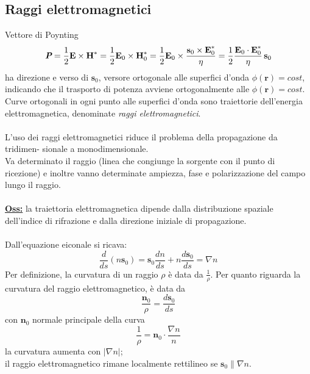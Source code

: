 \documentclass[a4paper]{article}
\begin{document}
\subsection*{Raggi elettromagnetici}
Vettore di Poynting
\begin{equation*}
\emph{\textbf{P}}=\frac{1}{2}\textbf{E}\times\textbf{H}^*=\frac{1}{2}\textbf{E}_0\times\textbf{H}_0^*=\frac{1}{2}\textbf{E}_0\times\frac{\textbf{s}_0\times\textbf{E}_0^*}{\eta}=\frac{1}{2}\frac{\textbf{E}_0\cdot\textbf{E}_0^*}{\eta}\,\textbf{s}_0
\end{equation*}
ha direzione e verso di $\textbf{s}_0$, versore ortogonale alle superfici d'onda $\phi(\textbf{r})=cost$, indicando che il trasporto di potenza avviene ortogonalmente alle $\phi(\textbf{r})=cost$. Curve ortogonali in ogni punto alle superfici d'onda sono traiettorie dell'energia elettromagnetica, denominate \emph{raggi elettromagnetici}.\\\\
L’uso dei raggi elettromagnetici riduce il problema della propagazione da tridimen-
sionale a monodimensionale.\\
Va determinato il raggio (linea che congiunge la sorgente con il punto di ricezione)
e inoltre vanno determinate ampiezza, fase e polarizzazione del campo lungo il raggio.\\\\
\underline{\textbf{Oss:}} la traiettoria elettromagnetica dipende dalla distribuzione spaziale dell’indice di rifrazione e dalla direzione iniziale di propagazione.\\\\
Dall'equazione eiconale si ricava:
\begin{equation*}
\frac{d}{ds}(n\textbf{s}_0)=\textbf{s}_0\frac{dn}{ds}+n\frac{d\textbf{s}_0}{ds}=\nabla n
\end{equation*}
Per definizione, la curvatura di un raggio $\rho$ è data da $\frac{1}{\rho}$. Per quanto riguarda la curvatura del raggio elettromagnetico, è data da
\begin{equation*}
\frac{\textbf{n}_0}{\rho}=\frac{d\textbf{s}_0}{ds}
\end{equation*}
con $\textbf{n}_0$ normale principale della curva
\begin{equation*}
\frac{1}{\rho}=\textbf{n}_0\cdot\frac{\nabla n}{n}
\end{equation*}
la curvatura aumenta con $|\nabla n|$;\\
il raggio elettromagnetico rimane localmente rettilineo se $\textbf{s}_0\parallel\nabla n$.
\end{document}
